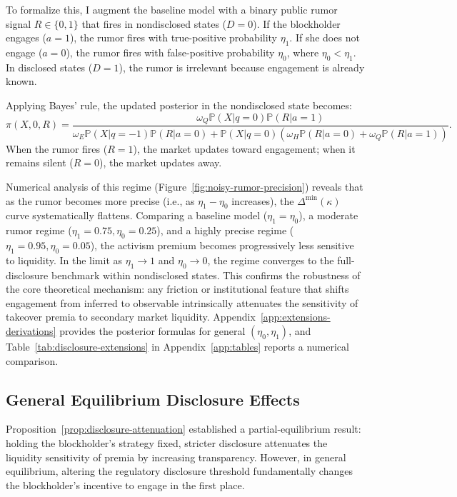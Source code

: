 \documentclass[11pt]{article}
\newcommand{\PP}{\mathbb{P}}
\newcommand{\1}{\mathbf{1}}
\begin{document}
To formalize this, I augment the baseline model with a binary public rumor signal $R \in \{0,1\}$ that fires in nondisclosed states ($D=0$). If the blockholder engages ($a=1$), the rumor fires with true-positive probability $\eta_1$. If she does not engage ($a=0$), the rumor fires with false-positive probability $\eta_0$, where $\eta_0 < \eta_1$. In disclosed states ($D=1$), the rumor is irrelevant because engagement is already known.

Applying Bayes' rule, the updated posterior in the nondisclosed state becomes:
\begin{equation}
\pi(X,0,R) = \frac{\omega_Q \PP(X|q=0) \PP(R|a=1)}{\omega_E \PP(X|q=-1)\PP(R|a=0) + \PP(X|q=0)(\omega_H \PP(R|a=0) + \omega_Q \PP(R|a=1))}.
\end{equation}
When the rumor fires ($R=1$), the market updates toward engagement; when it remains silent ($R=0$), the market updates away.

Numerical analysis of this regime (Figure~\ref{fig:noisy-rumor-precision}) reveals that as the rumor becomes more precise (i.e., as $\eta_1 - \eta_0$ increases), the $\Delta^{\min}(\kappa)$ curve systematically flattens. Comparing a baseline model ($\eta_1 = \eta_0$), a moderate rumor regime ($\eta_1 = 0.75, \eta_0 = 0.25$), and a highly precise regime ($\eta_1 = 0.95, \eta_0 = 0.05$), the activism premium becomes progressively less sensitive to liquidity. In the limit as $\eta_1 \to 1$ and $\eta_0 \to 0$, the regime converges to the full-disclosure benchmark within nondisclosed states. This confirms the robustness of the core theoretical mechanism: any friction or institutional feature that shifts engagement from inferred to observable intrinsically attenuates the sensitivity of takeover premia to secondary market liquidity. Appendix~\ref{app:extensions-derivations} provides the posterior formulas for general $(\eta_0,\eta_1)$, and Table~\ref{tab:disclosure-extensions} in Appendix~\ref{app:tables} reports a numerical comparison.

%
\subsection{General Equilibrium Disclosure Effects}
\label{sec:ge_disclosure}
%

Proposition~\ref{prop:disclosure-attenuation} established a partial-equilibrium result: holding the blockholder's strategy fixed, stricter disclosure attenuates the liquidity sensitivity of premia by increasing transparency. However, in general equilibrium, altering the regulatory disclosure threshold fundamentally changes the blockholder's incentive to engage in the first place.
\end{document}
